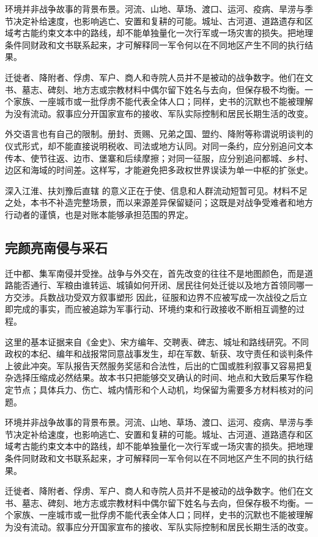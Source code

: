 环境并非战争故事的背景布景。河流、山地、草场、渡口、运河、疫病、旱涝与季节决定补给速度，也影响逃亡、安置和复耕的可能。城址、古河道、道路遗存和区域考古能约束文本中的路线，却不能单独量化一次行军或一场灾害的损失。把地理条件同财政和文书联系起来，才可解释同一军令何以在不同地区产生不同的执行结果。

迁徙者、降附者、俘虏、军户、商人和寺院人员并不是被动的战争数字。他们在文书、墓志、碑刻、地方志或宗教材料中偶尔留下姓名与去向，但保存极不均衡。一个家族、一座城市或一批俘虏不能代表全体人口；同样，史书的沉默也不能被理解为没有流动。叙事应分开国家宣布的接收、军队实际控制和居民长期生活的改变。

外交语言也有自己的限制。册封、贡赐、兄弟之国、盟约、降附等称谓说明谈判的仪式形式，却不能直接说明税收、司法或地方认同。对同一条约，应分别追问文本传本、使节往返、边市、堡寨和后续摩擦；对同一征服，应分别追问都城、乡村、边区和海域的时间差。这样写，才能避免把多政权世界误读为单一中枢的扩张史。

深入江淮、扶刘豫后直辖 的意义正在于使、信息和人群流动短暂可见。材料不足之处，本书不补造完整场景，而以来源差异保留疑问；这既是对战争受难者和地方行动者的谨慎，也是对账本能够承担范围的界定。

\subsection{完颜亮南侵与采石}

迁中都、集军南侵并受挫。战争与外交在，首先改变的往往不是地图颜色，而是道路能否通行、军粮由谁转运、城镇如何开闭、居民往何处迁徙以及地方首领同哪一方交涉。兵数战功受双方叙事塑形 因此，征服和边界不应被写成一次战役之后立即完成的事实，而应被追踪为军事行动、环境约束和行政接收不断相互调整的过程。

这里的基本证据来自《金史》、宋方编年、交聘表、碑志、城址和路线研究。不同政权的本纪、编年和战报常同意战事发生，却在军数、斩获、攻守责任和谈判条件上彼此冲突。军队报告天然服务奖惩和合法性，后出的亡国或胜利叙事又容易把复杂选择压缩成必然结果。故本书只把能够交叉确认的时间、地点和大致后果写作稳定节点；具体兵力、伤亡、城内情形和个人动机，均保留为需要多方材料核对的问题。

环境并非战争故事的背景布景。河流、山地、草场、渡口、运河、疫病、旱涝与季节决定补给速度，也影响逃亡、安置和复耕的可能。城址、古河道、道路遗存和区域考古能约束文本中的路线，却不能单独量化一次行军或一场灾害的损失。把地理条件同财政和文书联系起来，才可解释同一军令何以在不同地区产生不同的执行结果。

迁徙者、降附者、俘虏、军户、商人和寺院人员并不是被动的战争数字。他们在文书、墓志、碑刻、地方志或宗教材料中偶尔留下姓名与去向，但保存极不均衡。一个家族、一座城市或一批俘虏不能代表全体人口；同样，史书的沉默也不能被理解为没有流动。叙事应分开国家宣布的接收、军队实际控制和居民长期生活的改变。

